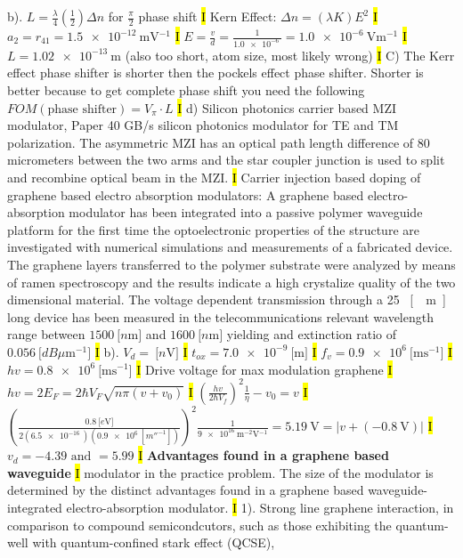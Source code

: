 \documentclass[fontsize=3]{scrartcl}
\begin{document}
b). $L = \frac{\lambda}{4}(\frac{1}{2})\Delta n$ for $\frac{\pi}{2}$ phase shift
\hl{I}
Kern Effect: $\Delta n = (\lambda K)E^2$
\hl{I}
$a_2 = r_{41} = \SI{1.5e-12}{\meter \volt^{-1}}$
\hl{I}
$E = \frac{v}{d} = \frac{1}{ \SI{ 1.0e-6 }{}} = \SI{1.0e-6 }{ \volt \meter^{-1}}$
\hl{I}
$L =  \SI{1.02e-13}{\meter}$ (also too short, atom size, most likely wrong)
\hl{I}
C) The Kerr effect phase shifter is shorter then the pockels effect phase shifter. Shorter is better because to get complete phase shift you need the following $FOM(\text{phase shifter}) = V_{\pi} \cdot L$
\hl{I}
d) Silicon photonics carrier based MZI modulator, Paper 40 GB/s silicon photonics modulator for TE and TM polarization. The asymmetric MZI has an optical path length difference of 80 micrometers between the two arms and the star coupler junction is used to split and recombine optical beam in the MZI.
\hl{I}
Carrier injection based doping of graphene based electro absorption modulators: A graphene based electro-absorption modulator has been integrated into a passive polymer waveguide platform for the first time the optoelectronic properties of the structure are investigated with numerical simulations and measurements of a fabricated device. The graphene layers transferred to the polymer substrate were analyzed by means of ramen spectroscopy and the results indicate a high crystalize quality of the two dimensional material. The voltage dependent transmission through a 25 \SI{}{[ \mu \meter ]} long device has been measured in the telecommunications relevant wavelength range between $1500  \SI{}{[ n \meter ]}$ and $1600  \SI{}{[ n \meter ]}$ yielding and extinction ratio of $0.056  \SI{}{[ dB \mu\meter^{-1} ]}$ 
\hl{I}
b). $V_d = \SI{}{[ n \volt ]} $
\hl{I}
$t_{ox} = \SI{7.0e-9}{[ \meter ]}$
\hl{I}
$f_v = \SI{0.9e6}{[ \meter \second^{-1} ]}$
\hl{I}
$hv = \SI{0.8e6}{[ \meter \second^{-1} ]}$
\hl{I}
Drive voltage for max modulation graphene
\hl{I}
$hv = 2E_{F} = 2\hbar V_F \sqrt{n \pi (v+v_0)}$
\hl{I}
$(\frac{hv}{2\hbar V_f})^2 \frac{1}{\eta} - v_0 = v$
\hl{I}
$(\frac{0.8 \SI{}{ [ e\volt ] } } {2 (\SI{6.5e-16}{}) (\SI{0.9e6}{ [ m\second^{-1} ] })  } )^2 \frac{1}{\SI{9e16}{\meter^{-2} \volt^{-1} }} = \SI{5.19}{\volt} = |v + (\SI{-0.8}{\volt})|$
\hl{I}
$v_d = -4.39 \text{ and } = 5.99$
\hl{I}
\textbf{Advantages found in a graphene based waveguide}
\hl{I}
modulator in the practice problem. The size of the modulator is determined by the distinct advantages found in a graphene based waveguide-integrated electro-absorption modulator.
\hl{I}
1). Strong line graphene interaction, in comparison to compound semicondcutors, such as those exhibiting the quantum-well with quantum-confined stark effect (QCSE),
\end{document}
